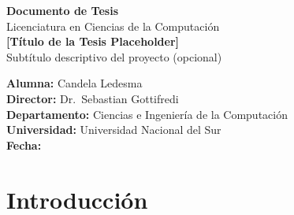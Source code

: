 \documentclass[12pt, a4paper]{report}
\begin{document}
\begin{titlepage}
  \centering


  \vspace{1cm}

  {\LARGE \textbf{Documento de Tesis}}\\[0.3cm]
  {\large Licenciatura en Ciencias de la Computación}\\[2cm]

  {\huge \textbf{[Título de la Tesis Placeholder]}}\\[0.5cm]
  {\large Subtítulo descriptivo del proyecto (opcional)}\\[2.5cm]

  \begin{flushleft}
    \large
    \textbf{Alumna:} Candela Ledesma \\[0.4cm]
    \textbf{Director:} Dr.\ Sebastian Gottifredi \\[0.4cm]
    \textbf{Departamento:} Ciencias e Ingeniería de la Computación \\[0.4cm]
    \textbf{Universidad:} Universidad Nacional del Sur \\[0.4cm]
    \textbf{Fecha:} \the\year
  \end{flushleft}

  \vfill
\end{titlepage}

\setcounter{page}{1}

\newpage
\thispagestyle{empty}
\mbox{}

\newpage
\tableofcontents

\newpage
{}
\setcounter{page}{1}

\chapter{Introducción}
\label{cap:introduccion}
\end{document}
